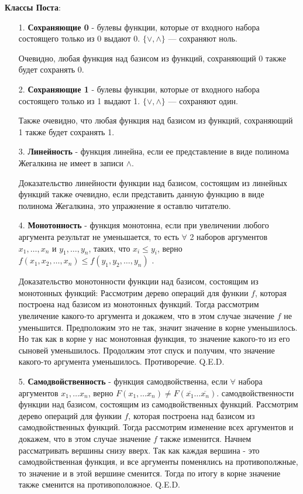 \documentclass{article}
\begin{document}
\textbf{Классы Поста}:
\begin{enumerate}
    \item[1.] \textbf{Сохраняющие 0} - булевы функции, которые от входного набора состоящего только из 0 выдают 0.  $\{\vee, \wedge\}$ --- сохраняют ноль.
    
    Очевидно, любая функция над базисом из функций, сохраняющий 0 также будет сохранять 0.
    \item[2.] \textbf{Сохраняющие 1} - булевы функции, которые от входного набора состоящего только из 1 выдают 1.  $\{\vee, \wedge\}$ --- сохраняют один. 
    
    Также очевидно, что любая функция над базисом из функций, сохраняющий 1 также будет сохранять 1.
    \item[3.] \textbf{Линейность} - функция линейна, если ее представление в виде полинома Жегалкина не имеет в записи $\wedge$. 
    
    Доказательство линейности функции над базисом, состоящим из линейных функций также очевидно, если представить данную функцию в виде полинома Жегалкина, это упражнение я оставлю читателю.
    \item[4.] \textbf{Монотонность} - функция монотонна, если при увеличении любого аргумента результат не уменьшается, то есть $\forall$ 2 наборов аргументов $x_1, \ldots, x_n$ и $y_1, \ldots, y_n$, таких, что $x_i\leq y_i$, верно $f(x_1,x_2, \ldots, x_n) \leq f(y_1,y_2, \ldots, y_n)$ .
    
    Доказательство монотонности функции над базисом, состоящим из монотонных функций: Рассмотрим дерево операций для функии $f$, которая построена над базисом из монотонных функций. Тогда рассмотрим увеличение какого-то аргумента и докажем, что в этом случае значение $f$ не уменьшится. Предположим это не так, значит значение в корне уменьшилось. Но так как в корне у нас монотонная функция, то значение какого-то из его сыновей уменьшилось. Продолжим этот спуск и получим, что значение какого-то аргумента уменьшилось. Противоречие. Q.E.D. 
    \item[5.] \textbf{Самодвойственность} - функция самодвойственна, если $\forall$ набора аргументов $x_1, \ldots x_n$, верно  $F(x_1, \dots x_n)\neq F(\overline{x_1} \dots \overline{x_n})$. самодвойственности функции над базисом, состоящим из самодвойственных функций. Рассмотрим дерево операций для функии $f$, которая построена над базисом из самодвойственных функций. Тогда рассмотрим изменение всех аргументов и докажем, что в этом случае значение $f$ также изменится. Начнем рассматривать вершины снизу вверх. Так как каждая вершина - это самодвойственная функция, и все аргументы поменялись на противополжные, то значение и в этой вершине сменится. Тогда по итогу в корне значение также сменится на противоположное. Q.E.D. 
\end{enumerate}
\end{document}
